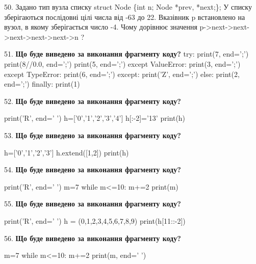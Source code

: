 \documentclass[11pt]{article}
\begin{document}
\par\vspace{5mm}

50. 
Задано тип вузла списку
struct Node \{int n; Node *prev, *next;\};
У списку зберігаються послідовні цілі числа від -63 до 22. Вказівник p встановлено на вузол, в якому зберігається число -4.
Чому дорівнює значення p->next->next->next->next->next->n ?\par\vspace{5mm}

51. \textbf{Що буде виведено за виконання фрагменту коду?}
try:
    print(7, end=';')
    print(8//0.0, end=';')
    print(5, end=';')
except ValueError:
    print(3, end=';')
except TypeError:
    print(6, end=';')
except:
    print('Z', end=';')
else:
    print(2, end=';')
finally:
    print(1)
\par\vspace{5mm}

52. \textbf{Що буде виведено за виконання фрагменту коду?}

print('R', end=' ')
h=['0','1','2','3','4']
h[:-2]='13'
print(h)

\par\vspace{5mm}

53. \textbf{Що буде виведено за виконання фрагменту коду?}

h=['0','1','2','3']
h.extend([1,2])
print(h)

\par\vspace{5mm}

54. \textbf{Що буде виведено за виконання фрагменту коду?}

print('R', end=' ')
m=7
while m<=10:
    m+=2
print(m)

\par\vspace{5mm}

55. \textbf{Що буде виведено за виконання фрагменту коду?}

print('R', end=' ')
h = (0,1,2,3,4,5,6,7,8,9)
print(h[11::-2])

\par\vspace{5mm}

56. \textbf{Що буде виведено за виконання фрагменту коду?}

m=7
while m<=10:
    m+=2
print(m, end=' ')
\end{document}
